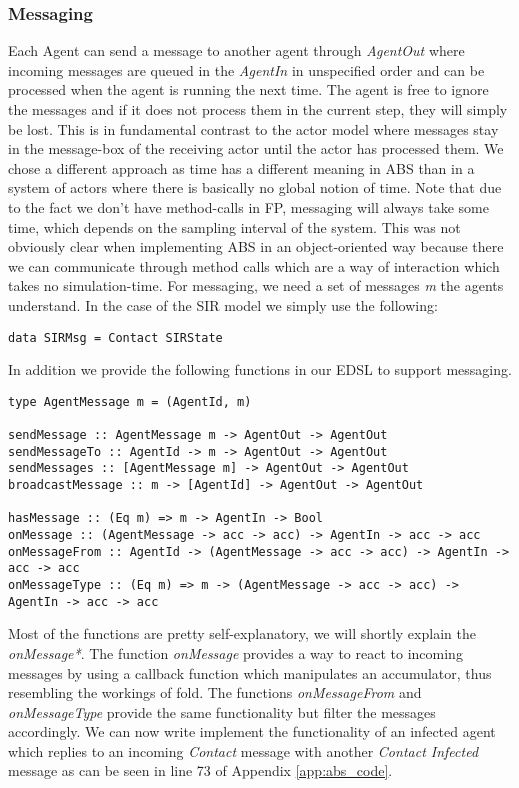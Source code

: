 \subsubsection{Messaging}
Each Agent can send a message to another agent through \textit{AgentOut} where incoming messages are queued in the \textit{AgentIn} in unspecified order and can be processed when the agent is running the next time. The agent is free to ignore the messages and if it does not process them in the current step, they will simply be lost. This is in fundamental contrast to the actor model where messages stay in the message-box of the receiving actor until the actor has processed them. We chose a different approach as time has a different meaning in ABS than in a system of actors where there is basically no global notion of time.
Note that due to the fact we don't have method-calls in FP, messaging will always take some time, which depends on the sampling interval of the system. This was not obviously clear when implementing ABS in an object-oriented way because there we can communicate through method calls which are a way of interaction which takes no simulation-time.
For messaging, we need a set of messages \textit{m} the agents understand. In the case of the SIR model we simply use the following:

\begin{verbatim}
data SIRMsg = Contact SIRState
\end{verbatim}

In addition we provide the following functions in our EDSL to support messaging.

\begin{verbatim}
type AgentMessage m = (AgentId, m)

sendMessage :: AgentMessage m -> AgentOut -> AgentOut
sendMessageTo :: AgentId -> m -> AgentOut -> AgentOut
sendMessages :: [AgentMessage m] -> AgentOut -> AgentOut
broadcastMessage :: m -> [AgentId] -> AgentOut -> AgentOut

hasMessage :: (Eq m) => m -> AgentIn -> Bool
onMessage :: (AgentMessage -> acc -> acc) -> AgentIn -> acc -> acc
onMessageFrom :: AgentId -> (AgentMessage -> acc -> acc) -> AgentIn -> acc -> acc
onMessageType :: (Eq m) => m -> (AgentMessage -> acc -> acc) -> AgentIn -> acc -> acc
\end{verbatim}

Most of the functions are pretty self-explanatory, we will shortly explain the \textit{onMessage*}. The function \textit{onMessage} provides a way to react to incoming messages by using a callback function which manipulates an accumulator, thus resembling the workings of fold. The functions \textit{onMessageFrom} and \textit{onMessageType} provide the same functionality but filter the messages accordingly. We can now write implement the functionality of an infected agent which replies to an incoming \textit{Contact} message with another \textit{Contact Infected} message as can be seen in line 73 of Appendix \ref{app:abs_code}.

